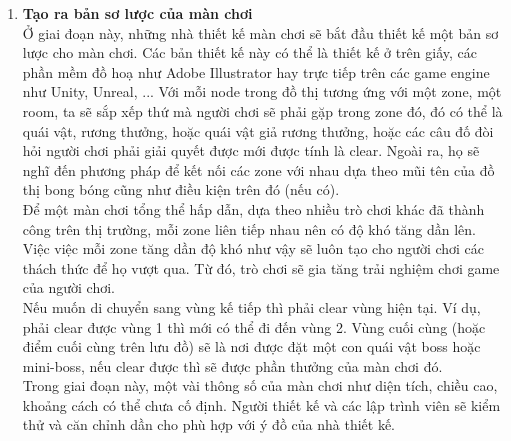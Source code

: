 \begin{enumerate}
	\item \textbf{Tạo ra bản sơ lược của màn chơi}\\
	\hspace*{1cm}  Ở giai đoạn này, những nhà thiết kế màn chơi sẽ bắt đầu thiết kế một bản sơ lược cho màn chơi. Các bản thiết kế này có thể là thiết kế ở trên giấy, các phần mềm đồ hoạ như Adobe Illustrator hay
	trực tiếp trên các game engine như Unity, Unreal, ... Với mỗi node trong đồ thị tương ứng với một zone, một room, ta sẽ sắp xếp thứ mà người chơi sẽ phải gặp trong zone đó, đó có thể là quái vật, rương thưởng, hoặc quái vật giả rương thưởng, hoặc các câu đố đòi hỏi người chơi phải giải quyết được mới được tính là clear.  Ngoài ra, họ sẽ nghĩ đến phương pháp để kết nối các zone với nhau dựa theo mũi tên của đồ thị bong bóng cũng như điều kiện trên đó (nếu có).\\
	\hspace*{1cm} Để một màn chơi tổng thể hấp dẫn, dựa theo nhiều trò chơi khác đã thành công trên thị trường, mỗi zone liên tiếp nhau nên có độ khó tăng dần lên. Việc việc mỗi zone tăng dần độ khó như vậy sẽ luôn tạo cho người chơi các thách thức để họ vượt qua. Từ đó, trò chơi sẽ gia tăng trải nghiệm chơi game của người chơi.\\
	\hspace*{1cm} Nếu muốn di chuyển sang vùng kế tiếp thì phải clear vùng hiện tại. Ví dụ, phải clear được vùng 1 thì mới có thể đi đến vùng 2.  Vùng cuối cùng (hoặc điểm cuối cùng trên lưu đồ) sẽ là nơi được đặt một con quái vật boss hoặc mini-boss, nếu clear được thì sẽ được phần thưởng của màn chơi đó.\\
	\hspace*{1cm} Trong giai đoạn này, một vài thông số của màn chơi như diện tích, chiều cao, khoảng cách có thể chưa cố định. Người thiết kế và các lập trình viên sẽ kiểm thử và căn chỉnh dần cho phù hợp với ý đồ của nhà thiết kế.\\ 
\end{enumerate}

